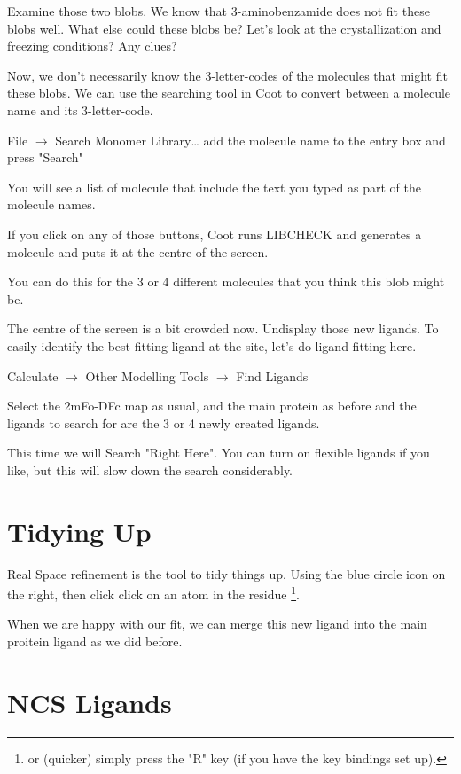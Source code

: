 \documentclass{article}
\begin{document}
Examine those two blobs.  We know that 3-aminobenzamide does not fit
these blobs well.  What else could these blobs be?  Let's look at the
crystallization and freezing conditions?  Any clues?

 Now, we don't necessarily know the 3-letter-codes of the molecules
 that might fit these blobs. We can use the searching tool in Coot to
 convert between a molecule name and its 3-letter-code.  

 \textsf{File $\rightarrow$ Search Monomer Library\ldots}
 add the molecule name to the entry box and press "Search"

 You will see a list of molecule that include the text you typed as
 part of the molecule names.

 If you click on any of those buttons, Coot runs LIBCHECK and
 generates a molecule and puts it at the centre of the screen.

 You can do this for the 3 or 4 different molecules that you think
 this blob might be.

 The centre of the screen is a bit crowded now.  Undisplay those new
 ligands.  To easily identify the best fitting ligand at the site,
 let's do ligand fitting here.

 \textsf{Calculate $\rightarrow$ Other Modelling Tools $\rightarrow$
   Find Ligands }

 Select the 2mFo-DFc map as usual, and the main protein as before and
 the ligands to search for are the 3 or 4 newly created ligands.

 This time we will Search "Right Here".  You can turn on flexible
 ligands if you like, but this will slow down the search
 considerably. 

\section{Tidying Up}

Real Space refinement is the tool to tidy things up. Using the blue
circle icon on the right, then click click on an atom in the residue
\footnote{or (quicker) simply press the "R" key (if you have the key
  bindings set up).}.

 When we are happy with our fit, we can merge this new ligand into the
 main proitein ligand as we did before.

\section{NCS Ligands}
\end{document}
